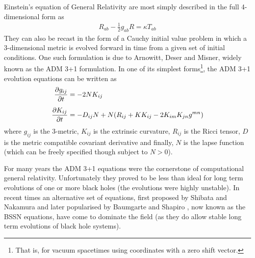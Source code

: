 \documentclass[a4paper,12pt]{article}
\numberwithin{equation}{section}%
\begin{document}
Einstein's equation of General Relativity are most simply described in the full 4-dimensional
form as
\begin{align}
   R_{ab} - \frac{1}{2} g_{ab} R = \kappa T_{ab}
\end{align}
They can also be recast in the form of a Cauchy initial value problem in which a
3-dimensional metric is evolved forward in time from a given set of initial conditions. One
such formulation is due to Arnowitt, Deser and Misner, widely known as the ADM 3+1
formulation. In one of its simplest forms\footnote{That is, for vacuum spacetimes using
coordinates with a zero shift vector.}, the ADM 3+1 evolution equations can be written as
\begin{align}
   \frac{\partial g_{i j}}{\partial t} &= -2 N K_{i j}\\[5pt]
   \frac{\partial K_{i j}}{\partial t} &= -D_{i j}{N} + N (R_{i j} + {K} K_{i j} - 2 K_{i m} K_{j n} g^{m n})
\end{align}
where $g_{ij}$ is the 3-metric, $K_{ij}$ is the extrinsic curvature, $R_{ij}$ is the Ricci
tensor, $D$ is the metric compatible covariant derivative and finally, $N$ is the lapse
function (which can be freely specified though subject to $N>0$).

For many years the ADM 3+1 equations were the cornerstone of computational general
relativity. Unfortunately they proved to be less than ideal for long term evolutions of one
or more black holes (the evolutions were highly unstable). In recent times an alternative
set of equations, first proposed by Shibata and Nakamura \cite{shibata:1995-01} and later
popularised by Baumgarte and Shapiro \cite{baumgarte:1998-01}, now known as the BSSN
equations, have come to dominate the field (as they do allow stable long term evolutions of
black hole systems).
\end{document}
